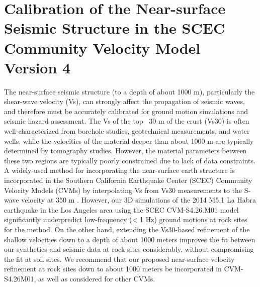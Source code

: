
\linespread{1.7}
\chapter{Calibration of the Near-surface Seismic Structure in the SCEC Community Velocity Model Version 4}
\linespread{2.0}
\label{chap:vs30}

\graphicspath{{/Users/zhh076/work/PhD_way/vs30/}}

The near-surface seismic structure (to a depth of about 1000 m), particularly the shear-wave velocity (Vs), can strongly affect the propagation of seismic waves, and therefore must be accurately calibrated for ground motion simulations and seismic hazard assessment. The Vs of the top ~30 m of the crust (Vs30) is often well-characterized from borehole studies, geotechnical measurements, and water wells, while the velocities of the material deeper than about 1000 m are typically determined by tomography studies. However, the material parameters between these two regions are typically poorly constrained due to lack of data constraints. A widely-used method for incorporating the near-surface earth structure is incorporated in the Southern California Earthquake Center (SCEC) Community Velocity Models (CVMs) by interpolating Vs from Vs30 measurements to the S-wave velocity at 350 m \citep{elyVs30derivedNearsurfaceSeismic2010}. However, our 3D simulations of the 2014 M5.1 La Habra earthquake in the Los Angeles area using the SCEC CVM-S4.26.M01 model significantly underpredict low-frequency (< 1 Hz) ground motions at rock sites for the \citet{elyVs30derivedNearsurfaceSeismic2010} method. On the other hand, extending the Vs30-based refinement of the shallow velocities down to a depth of about 1000 meters improves the fit between our synthetics and seismic data at rock sites considerably, without compromising the fit at soil sites. We recommend that our proposed near-surface velocity refinement at rock sites down to about 1000 meters be incorporated in CVM-S4.26M01, as well as considered for other CVMs.


